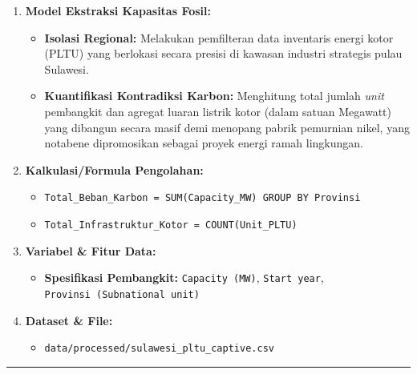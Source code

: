 \documentclass[
]{article}
\providecommand{\tightlist}{%
  \setlength{\itemsep}{0pt}\setlength{\parskip}{0pt}}
\begin{document}
\begin{enumerate}
\def\labelenumi{\arabic{enumi}.}
\tightlist
\item
  \textbf{Model Ekstraksi Kapasitas Fosil:}

  \begin{itemize}
  \tightlist
  \item
    \textbf{Isolasi Regional:} Melakukan pemfilteran data inventaris
    energi kotor (PLTU) yang berlokasi secara presisi di kawasan
    industri strategis pulau Sulawesi.
  \item
    \textbf{Kuantifikasi Kontradiksi Karbon:} Menghitung total jumlah
    \emph{unit} pembangkit dan agregat luaran listrik kotor (dalam
    satuan Megawatt) yang dibangun secara masif demi menopang pabrik
    pemurnian nikel, yang notabene dipromosikan sebagai proyek energi
    ramah lingkungan.
  \end{itemize}
\item
  \textbf{Kalkulasi/Formula Pengolahan:}

  \begin{itemize}
  \tightlist
  \item
    \texttt{Total\_Beban\_Karbon\ =\ SUM(Capacity\_MW)\ GROUP\ BY\ Provinsi}
  \item
    \texttt{Total\_Infrastruktur\_Kotor\ =\ COUNT(Unit\_PLTU)}
  \end{itemize}
\item
  \textbf{Variabel \& Fitur Data:}

  \begin{itemize}
  \tightlist
  \item
    \textbf{Spesifikasi Pembangkit:} \texttt{Capacity\ (MW)},
    \texttt{Start\ year}, \texttt{Provinsi\ (Subnational\ unit)}
  \end{itemize}
\item
  \textbf{Dataset \& File:}

  \begin{itemize}
  \tightlist
  \item
    \texttt{data/processed/sulawesi\_pltu\_captive.csv}
  \end{itemize}
\end{enumerate}

\begin{center}\rule{0.5\linewidth}{0.5pt}\end{center}
\end{document}
